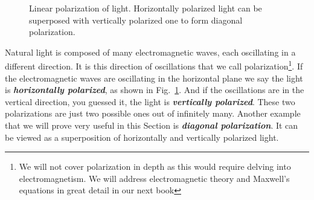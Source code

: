 \begin{figure}[t]
    \centering
    \caption[Linear polarization of light]{Linear polarization of light. Horizontally polarized light can be superposed with vertically polarized one to form diagonal polarization.}
    \label{fig:polarization}
\end{figure}

Natural light is composed of many electromagnetic waves, each oscillating in a different direction.
It is this direction of oscillations that we call polarization\footnote{We will not cover polarization in depth as this would require delving into electromagnetism. We will address electromagnetic theory and Maxwell's equations in great detail in our next book}.
If the electromagnetic waves are oscillating in the horizontal plane we say the light is \textbf{\emph{horizontally polarized}}, as shown in Fig.~\ref{fig:polarization}.
And if the oscillations are in the vertical direction, you guessed it, the light is \textbf{\emph{vertically polarized}}.
These two polarizations are just two possible ones out of infinitely many.
Another example that we will prove very useful in this Section is \textbf{\emph{diagonal polarization}}.
It can be viewed as a superposition of horizontally and vertically polarized light.

